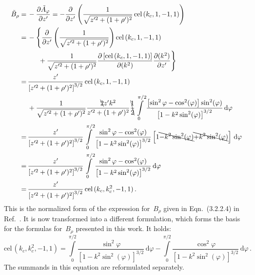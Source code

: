 \begin{align}
      \tilde{B}_\rho
 =&\, - \frac{\partial \tilde{A}_\varphi}{\partial z'}
 =    - \frac{\partial}{\partial z'} \left( \frac{1}{\sqrt{z'^2 + (1 + \rho')^2}} \,\textrm{cel}\,(k_c, 1, -1, 1) \right) \nonumber \\
 =&\,          -\Biggl\{    \frac{\partial}{\partial z'} \left( \frac{1}{\sqrt{z'^2 + (1 + \rho')^2}} \right) \textrm{cel}\,(k_c, 1, -1, 1) \nonumber \\
 ~&\, \phantom{-\Biggl\{} + \frac{1}{\sqrt{z'^2 + (1 + \rho')^2}} \frac{\partial \left[\textrm{cel}\,(k_c, 1, -1, 1)\right]}{\partial(k^2)} \frac{\partial (k^2)}{\partial z'} \Biggr\} \nonumber \\
 =&\,   \frac{z'}{\left[ z'^2 + (1 + \rho')^2 \right]^{3/2}} \,\textrm{cel}\,(k_c, 1, -1, 1) \nonumber \\
 ~&\, + \frac{1}{\sqrt{z'^2 + (1 + \rho')^2}} \frac{\bcancel{2} z' k^2}{z'^2 + (1 + \rho')^2}
        \bcancel{\frac{1}{2}} \int\limits_0^{\pi/2} \frac{\left[\sin^2{\varphi} - \cos^2(\varphi)\right]\sin^2(\varphi)}{\left[1 - k^2 \sin^2(\varphi)\right]^{3/2}} \,\mathrm{d}\varphi \nonumber \\
 =&\, \frac{z'}{\left[ z'^2 + (1 + \rho')^2 \right]^{3/2}}
      \int\limits_0^{\pi/2}
        \frac{\sin^2{\varphi} - \cos^2(\varphi)}{\left[1 - k^2 \sin^2(\varphi)\right]^{3/2}}
        \left[ 1 \bcancel{-k^2\sin^2(\varphi)} \bcancel{+k^2\sin^2(\varphi)} \right] \,\mathrm{d}\varphi \nonumber \\
 =&\, \frac{z'}{\left[ z'^2 + (1 + \rho')^2 \right]^{3/2}}
      \int\limits_0^{\pi/2} \frac{\sin^2{\varphi} - \cos^2(\varphi)}{\left[1 - k^2 \sin^2(\varphi)\right]^{3/2}} \,\mathrm{d}\varphi \nonumber \\
 =&\, \frac{z'}{\left[ z'^2 + (1 + \rho')^2 \right]^{3/2}} \,\textrm{cel}\,(k_c, k_c^2, -1, 1) \, .
\end{align}
This is the normalized form of the expression for~$B_\rho$ given in Eqn.~(3.2.2.4) in Ref.~\cite{teal}.
It is now transformed into a different formulation, which forms the basis for the formulas for~$B_\rho$ presented in this work.
It holds:
\begin{equation}
   \textrm{cel}\,(k_c, k_c^2, -1, 1)
 =   \int\limits_0^{\pi/2} \frac{\sin^2{\varphi}}{\left[1 - k^2 \sin^2(\varphi)\right]^{3/2}} \,\mathrm{d}\varphi
   - \int\limits_0^{\pi/2} \frac{\cos^2{\varphi}}{\left[1 - k^2 \sin^2(\varphi)\right]^{3/2}} \,\mathrm{d}\varphi \, .
\end{equation}
The summands in this equation are reformulated separately.

